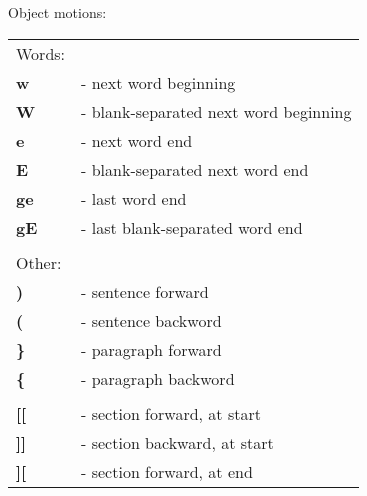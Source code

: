 \documentclass[a4paper,8pt]{extarticle}
\begin{document}
\begin{multicols*}{3}
        \noindent
        {\large Object motions:}\\
        \begin{tabular}{ l l }
            Words:                              &                                                           \\
            \textbf{w}                          &    - next word beginning                                  \\
            \textbf{W}                          &    - blank-separated next word beginning                  \\
            \textbf{e}                          &    - next word end                                        \\
            \textbf{E}                          &    - blank-separated next word end                        \\
            \textbf{ge}                         &    - last word end                                        \\
            \textbf{gE}                         &    - last blank-separated word end                        \\
                                                &                                                           \\
            Other:                              &                                                           \\
            \textbf{)}                          &    - sentence forward                                     \\
            \textbf{(}                          &    - sentence backword                                    \\
            \textbf{\}}                         &    - paragraph forward                                    \\
            \textbf{\{}                         &    - paragraph backword                                   \\
                                                &                                                           \\
            \textbf{[[}                         &    - section forward, at start                            \\
            \textbf{]]}                         &    - section backward, at start                           \\
            \textbf{][}                         &    - section forward, at end                              \\

\end{tabular}
\end{multicols*}
\end{document}
